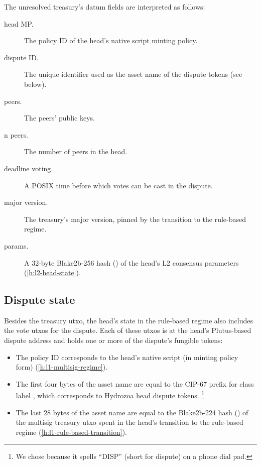 \documentclass[../hydrozoa.tex]{subfiles}
\begin{document}
The unresolved treasury's datum fields are interpreted as follows:
\begin{description}
  \item[head MP.] The policy ID of the head's native script minting policy.
  \item[dispute ID.] The unique identifier used as the asset name of the dispute tokens (see below).
  \item[peers.] The peers' public keys.
  \item[n peers.] The number of peers in the head.
  \item[deadline voting.] A POSIX time before which votes can be cast in the dispute.
  \item[major version.] The treasury's major version, pinned by the transition to the rule-based regime.
  \item[params.] A 32-byte Blake2b-256 hash () of the head's L2 consensus parameters (\cref{h:l2-head-state}).
\end{description}

\subsection{Dispute state}%
\label{h:l1-rule-based-dispute-state}%

Besides the treasury utxo, the head's state in the rule-based regime also includes the vote utxos for the dispute.
Each of these utxos is at the head's Plutus-based dispute address and holds one or more of the dispute's fungible tokens:
\begin{itemize}
  \item The policy ID corresponds to the head's native script (in minting policy form) (\cref{h:l1-multisig-regime}).
  \item The first four bytes of the asset name are equal to the CIP-67
    \citep{AlessandroKonradThomasVellekoopCIP67AssetName2022}
    prefix for class label \headDisputeToken{}, which corresponds to Hydrozoa head dispute tokens.%
    \footnote{We chose \headDisputeToken{} because it spells ``DISP'' (short for dispute) on a phone dial pad.}
  \item The last 28 bytes of the asset name are equal to the Blake2b-224 hash () of the multisig treasury utxo spent in the head's transition to the rule-based regime (\cref{h:l1-rule-based-transition}).
\end{itemize}
\end{document}

